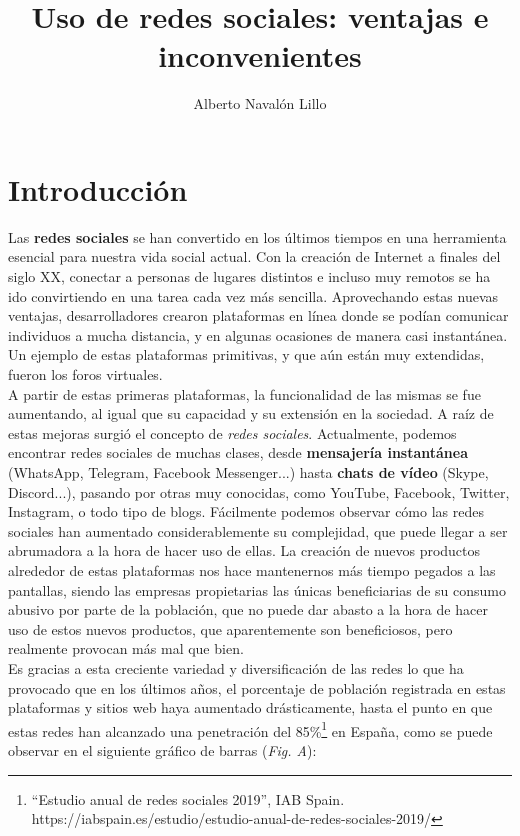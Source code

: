 \documentclass[12pt,a4paper]{article}
\title{\textbf{Uso de redes sociales: ventajas e inconvenientes}}
\author{Alberto Navalón Lillo}
\begin{document}
\maketitle
\tableofcontents

\section{Introducción}

Las \textbf{redes sociales} se han convertido en los últimos tiempos en una herramienta esencial para nuestra vida social actual. Con la creación de Internet a finales del siglo XX, conectar a personas de lugares distintos e incluso muy remotos se ha ido convirtiendo en una tarea cada vez más sencilla. Aprovechando estas nuevas ventajas, desarrolladores crearon plataformas en línea donde se podían comunicar individuos a mucha distancia, y en algunas ocasiones de manera casi instantánea. Un ejemplo de estas plataformas primitivas, y que aún están muy extendidas, fueron los foros virtuales.\\

A partir de estas primeras plataformas, la funcionalidad de las mismas se fue aumentando, al igual que su capacidad y su extensión en la sociedad. A raíz de estas mejoras surgió el concepto de \textit{redes sociales}. Actualmente, podemos encontrar redes sociales de muchas clases, desde \textbf{mensajería instantánea} (WhatsApp, Telegram, Facebook Messenger...) hasta \textbf{chats de vídeo} (Skype, Discord...), pasando por otras muy conocidas, como YouTube, Facebook, Twitter, Instagram, o todo tipo de blogs. Fácilmente podemos observar cómo las redes sociales han aumentado considerablemente su complejidad, que puede llegar a ser abrumadora a la hora de hacer uso de ellas. La creación de nuevos productos alrededor de estas plataformas nos hace mantenernos más tiempo pegados a las pantallas, siendo las empresas propietarias las únicas beneficiarias de su consumo abusivo por parte de la población, que no puede dar abasto a la hora de hacer uso de estos nuevos productos, que aparentemente son beneficiosos, pero realmente provocan más mal que bien.\\

Es gracias a esta creciente variedad y diversificación de las redes lo que ha provocado que en los últimos años, el porcentaje de población registrada en estas plataformas y sitios web haya aumentado drásticamente, hasta el punto en que estas redes han alcanzado una penetración del 85\%\footnote{``Estudio anual de redes sociales 2019'', IAB Spain.\\https://iabspain.es/estudio/estudio-anual-de-redes-sociales-2019/} en España, como se puede observar en el siguiente gráfico de barras (\textit{Fig. A}):\\
\end{document}
